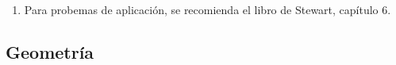 \begin{enumerate}
\begin{enumerate}[a)]
	\end{enumerate}
	\item Para probemas de aplicación, se recomienda el libro de Stewart, capítulo 6.
\end{enumerate}


\subsection{Geometría}
